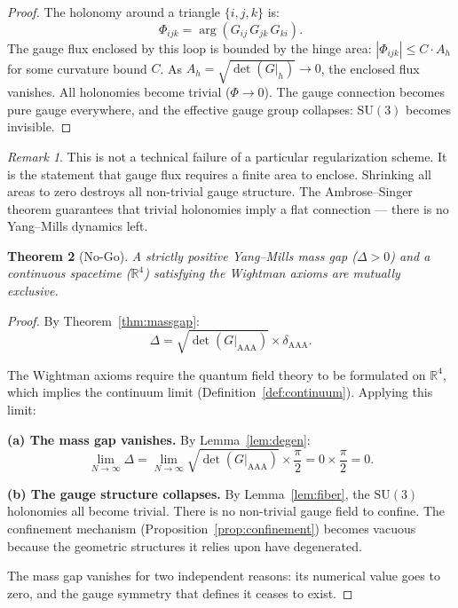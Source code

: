 \documentclass[12pt]{article}
\newtheorem{theorem}{Theorem}[section]
\theoremstyle{remark}
\newtheorem{remark}[theorem]{Remark}
\theoremstyle{definition}
\newcommand{\RR}{\mathbb{R}}
\begin{document}
\begin{proof}
The holonomy around a triangle $\{i, j, k\}$ is:
\begin{equation}
\Phi_{ijk} = \arg(G_{ij}\, G_{jk}\, G_{ki}).
\end{equation}
The gauge flux enclosed by this loop is bounded by the hinge area:
$|\Phi_{ijk}| \leq C \cdot A_h$ for some curvature bound $C$.
As $A_h = \sqrt{\det(G|_h)} \to 0$, the enclosed flux vanishes.
All holonomies become trivial ($\Phi \to 0$). The gauge connection
becomes pure gauge everywhere, and the effective gauge group collapses:
$\mathrm{SU}(3)$ becomes invisible.
\end{proof}

\begin{remark}
This is not a technical failure of a particular regularization scheme.
It is the statement that gauge flux requires a finite area to enclose.
Shrinking all areas to zero destroys all non-trivial gauge structure.
The Ambrose--Singer theorem \cite{Ambrose-Singer} guarantees that
trivial holonomies imply a flat connection --- there is no Yang--Mills
dynamics left.
\end{remark}

\begin{theorem}[No-Go]
\label{thm:nogo}
A strictly positive Yang--Mills mass gap ($\Delta > 0$) and a continuous
spacetime ($\RR^4$) satisfying the Wightman axioms are mutually
exclusive.
\end{theorem}

\begin{proof}
By Theorem~\ref{thm:massgap}:
\begin{equation}
\Delta = \sqrt{\det(G|_{\mathrm{AAA}})} \times \delta_{\mathrm{AAA}}.
\end{equation}

The Wightman axioms require the quantum field theory to be formulated on
$\RR^4$, which implies the continuum limit
(Definition~\ref{def:continuum}). Applying this limit:

\medskip\noindent
\textbf{(a) The mass gap vanishes.}
By Lemma~\ref{lem:degen}:
\begin{equation}
\lim_{N \to \infty} \Delta
= \lim_{N \to \infty} \sqrt{\det(G|_{\mathrm{AAA}})}
  \times \frac{\pi}{2}
= 0 \times \frac{\pi}{2} = 0.
\end{equation}

\textbf{(b) The gauge structure collapses.}
By Lemma~\ref{lem:fiber}, the $\mathrm{SU}(3)$ holonomies all become
trivial. There is no non-trivial gauge field to confine. The confinement
mechanism (Proposition~\ref{prop:confinement}) becomes vacuous because
the geometric structures it relies upon have degenerated.

\medskip\noindent
The mass gap vanishes for two independent reasons: its numerical value
goes to zero, and the gauge symmetry that defines it ceases to exist.
\end{proof}
\end{document}
